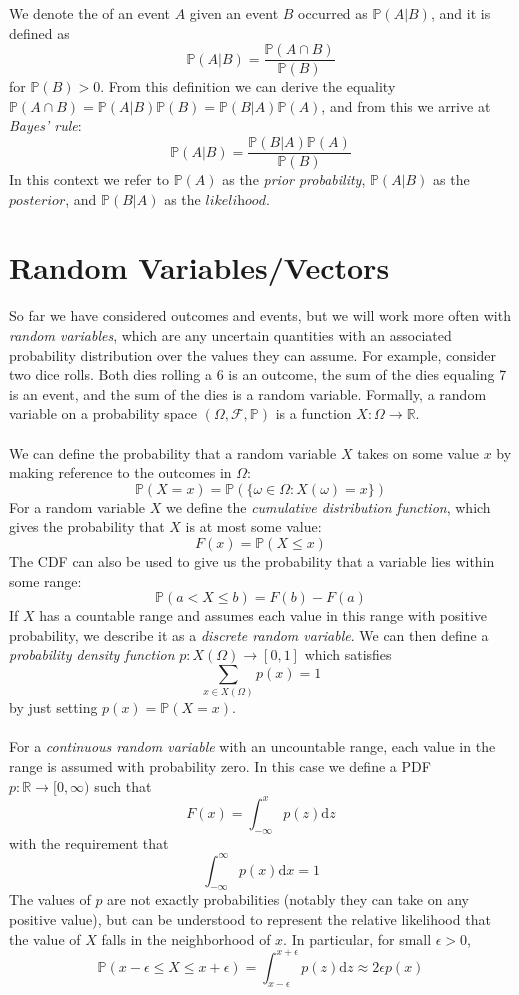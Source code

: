 \documentclass{article}
\newcommand{\PrMe}{\mathbb{P}}
\begin{document}
We denote the  of an event $A$ given an event $B$ occurred as $\PrMe(A | B)$, and it is defined as $$\PrMe(A | B) = \frac{\PrMe(A\cap B)}{\PrMe(B)}$$ for $\PrMe(B) > 0$. From this definition we can derive the equality $\PrMe(A\cap B) = \PrMe(A|B)\PrMe(B) = \PrMe(B|A)\PrMe(A)$, and from this we arrive at \textit{Bayes' rule}: $$\PrMe(A|B) = \frac{\PrMe(B|A)\PrMe(A)}{\PrMe(B)}$$ In this context we refer to $\PrMe(A)$ as the \textit{prior probability}, $\PrMe(A|B)$ as the $\textit{posterior}$, and $\PrMe(B|A)$ as the $\textit{likelihood}$.

\section{Random Variables/Vectors}
So far we have considered outcomes and events, but we will work more often with \textit{random variables}, which are any uncertain quantities with an associated probability distribution over the values they can assume. For example, consider two dice rolls. Both dies rolling a 6 is an outcome, the sum of the dies equaling 7 is an event, and the sum of the dies is a random variable. Formally, a random variable on a probability space $(\Omega, \mathcal{F}, \PrMe)$ is a function $X: \Omega \rightarrow \mathbb{R}$. \\\\
We can define the probability that a random variable $X$ takes on some value $x$ by making reference to the outcomes in $\Omega$: $$\PrMe(X = x) = \PrMe(\{\omega \in \Omega : X(\omega) = x\})$$
For a random variable $X$ we define the \textit{cumulative distribution function}, which gives the probability that $X$  is at most some value: $$F(x) = \PrMe(X \leq x)$$
The CDF can also be used to give us the probability that a variable lies within some range: $$\PrMe(a < X \leq b) = F(b) - F(a)$$
If $X$ has a countable range and assumes each value in this range with positive probability, we describe it as a \textit{discrete random variable}. We can then define a \textit{probability density function} $p: X(\Omega) \rightarrow [0, 1]$ which satisfies $$\sum_{x \in X(\Omega)} p(x) = 1$$ by just setting $p(x) = \PrMe(X = x)$. \\\\
For a \textit{continuous random variable} with an uncountable range, each value in the range is assumed with probability zero. In this case we define a PDF $p: \mathbb{R} \rightarrow [0, \infty)$ such that $$F(x) = \int_{-\infty}^x p(z) \text{d}z$$ with the requirement that $$\int_{-\infty}^\infty p(x)\text{d}x = 1$$ The values of $p$ are not exactly probabilities (notably they can take on any positive value), but can be understood to represent the relative likelihood that the value of $X$ falls in the neighborhood of $x$. In particular, for small $\epsilon > 0$, $$\PrMe(x - \epsilon \leq X \leq x + \epsilon) = \int_{x - \epsilon}^{x + \epsilon} p(z)\text{d}z \approx 2\epsilon p(x)$$
\end{document}
